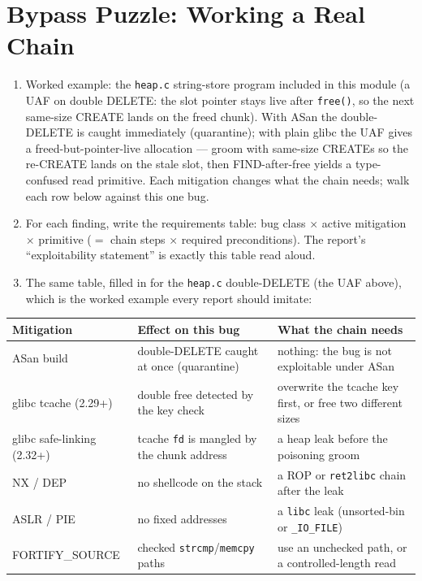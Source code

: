\documentclass[12pt]{Training}
\begin{document}
\section*{Bypass Puzzle: Working a Real Chain}
\begin{enumerate}
    \item Worked example: the \lstinline{heap.c} string-store program included in this module (a UAF on double DELETE: the slot pointer stays live after \lstinline{free()}, so the next same-size CREATE lands on the freed chunk). With ASan the double-DELETE is caught immediately (quarantine); with plain glibc the UAF gives a freed-but-pointer-live allocation --- groom with same-size CREATEs so the re-CREATE lands on the stale slot, then FIND-after-free yields a type-confused read primitive. Each mitigation changes what the chain needs; walk each row below against this one bug.
    \item For each finding, write the requirements table: bug class $\times$ active mitigation $\times$ primitive ($=$ chain steps $\times$ required preconditions). The report's ``exploitability statement'' is exactly this table read aloud.
    \item The same table, filled in for the \lstinline{heap.c} double-DELETE (the UAF above), which is the worked example every report should imitate:
\end{enumerate}

\begin{center}
\footnotesize
\begin{tabular}{@{}p{3.2cm}|p{5.4cm}|p{5.6cm}@{}}
\toprule
\textbf{Mitigation} & \textbf{Effect on this bug} & \textbf{What the chain needs} \\
\midrule
ASan build & double-DELETE caught at once (quarantine) & nothing: the bug is not exploitable under ASan \\
glibc tcache (2.29+) & double free detected by the key check & overwrite the tcache key first, or free two different sizes \\
glibc safe-linking (2.32+) & tcache \lstinline|fd| is mangled by the chunk address & a heap leak before the poisoning groom \\
NX / DEP & no shellcode on the stack & a ROP or \lstinline|ret2libc| chain after the leak \\
ASLR / PIE & no fixed addresses & a \lstinline|libc| leak (unsorted-bin or \lstinline|_IO_FILE|) \\
FORTIFY\_SOURCE & checked \lstinline|strcmp|/\lstinline|memcpy| paths & use an unchecked path, or a controlled-length read \\
\bottomrule
\end{tabular}
\end{center}
\end{document}
